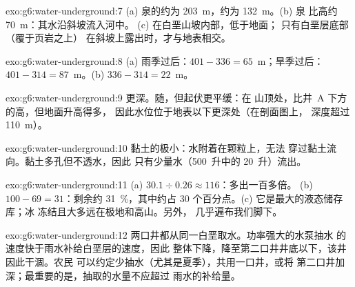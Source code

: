 \begin{solution}{exo:g6:water-underground:7}
(a) 泉的约为 203~m，约为 132~m。(b) 泉
比高约 70~m：其水沿斜坡流入河中。
(c) 在白垩山坡内部，低于地面；
只有白垩层底部（覆于页岩之上）
在斜坡上露出时，才与地表相交。
\end{solution}

\begin{solution}{exo:g6:water-underground:8}
(a) 雨季过后：$401 - 336 = 65$~m；旱季过后：
$401 - 314 = 87$~m。(b) $336 - 314 = 22$~m。
\end{solution}

\begin{solution}{exo:g6:water-underground:9}
更深。随，但起伏更平缓：在
山顶处，比井~A 下方的高，但地面升高得多，
因此水位位于地表以下更深处（在剖面图上，
深度超过 110~m）。
\end{solution}

\begin{solution}{exo:g6:water-underground:10}
黏土的极小：水附着在颗粒上，无法
穿过黏土流向。黏土多孔但不透水，因此
只有少量水（500~升中的 20~升）流出。
\end{solution}

\begin{solution}{exo:g6:water-underground:11}
(a) $30.1 \div 0.26 \approx 116$：多出一百多倍。
(b) $100 - 69 = 31$：剩余约 31~\%，其中约占 30
个百分点。(c) 它是最大的液态储存库；冰
冻结且大多远在极地和高山。另外，
几乎遍布我们脚下。
\end{solution}

\begin{solution}{exo:g6:water-underground:12}
两口井都从同一白垩取水。功率强大的水泵抽水
的速度快于雨水补给白垩层的速度，因此
整体下降，降至第二口井井底以下，该井因此干涸。农民
可以约定少抽水（尤其是夏季），共用一口井，或将
第二口井加深；最重要的是，抽取的水量不应超过
雨水的补给量。
\end{solution}

